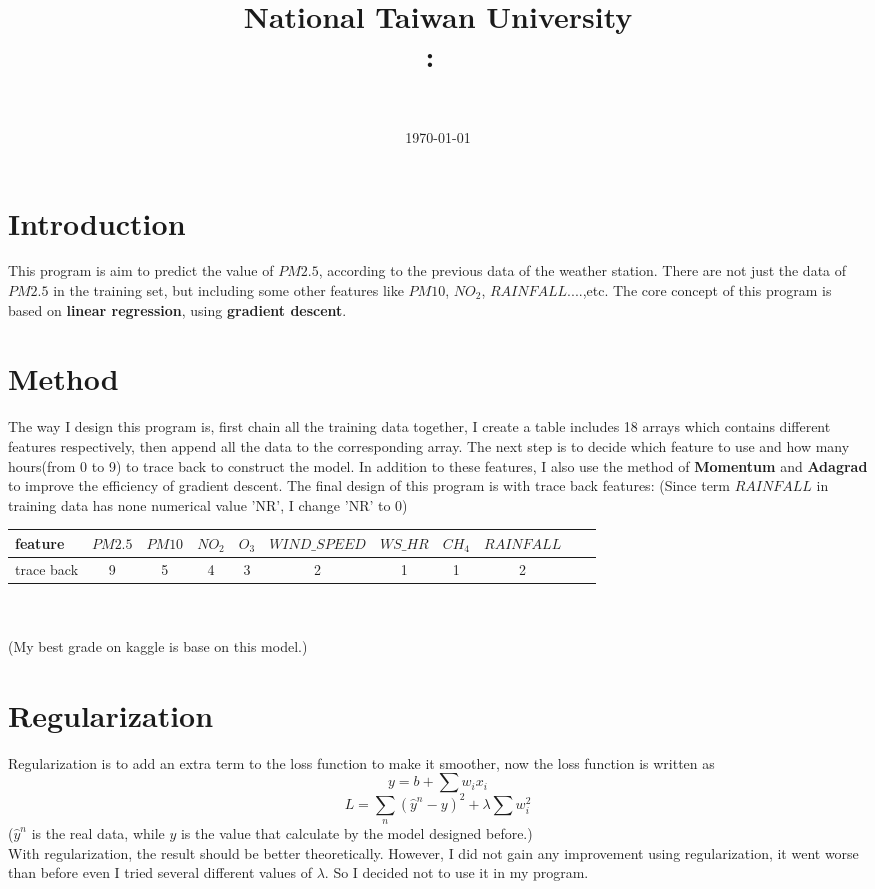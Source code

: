 \documentclass[11pt]{article}
\title{
{National Taiwan University}\\    
    \textmd{\textbf{\Class:\ \Title}}
}
\author{
	\Department \ \AuthorID \\
	\textbf{\AuthorName}
}
\date{
	\today \\
	\horline{1pt}
}
\newcommand\n{\mbox{\qquad}}
\begin{document}
\maketitle

\section{Introduction}
\n This program is aim to predict the value of $PM2.5$, according to the previous data of the weather station. There are not just the data of $PM2.5$ in the training set, but including some other features like $PM10$, $NO_2$, $RAINFALL$....,etc. The core concept of this program is based on \textbf{linear regression}, using \textbf{gradient descent}.

\section{Method}
\n The way I design this program is, first chain all the training data together, I create a table includes 18 arrays which contains different features respectively, then append all the data to the corresponding array. The next step is to decide which feature to use and how many hours(from 0 to 9) to trace back to construct the model. In addition to these features, I also use the method of \textbf{Momentum} and \textbf{Adagrad} to improve the efficiency of gradient descent. The final design of this program is with trace back features: (Since term $RAINFALL$ in training data has none numerical value 'NR', I change 'NR' to 0)\\
\begin{tabular}[t]{|l|c|c|c|c|c|c|c|c|c|c|}
	\hline
	feature & $PM2.5$ & $PM10$ & $NO_2$ & $O_3$ & $WIND\_SPEED$ & $WS\_HR$ & $CH_4$ & 	$RAINFALL$\\
	\hline 
	trace back & 9 & 5 & 4 & 3 & 2 & 1 & 1 & 2\\
	\hline
\end{tabular} 
\\ \\ 
\n (My best grade on kaggle is base on this model.)

\section{Regularization}
\n Regularization is to add an extra term to the loss function to make it smoother, now the loss function is written as
\[ y = b + \sum w_i x_i \]
\begin{equation}
	L = \sum_n (\widehat{y}^n - y)^2 + \lambda \sum w_i^2
\end{equation}
\n ($\widehat{y}^n$ is the real data, while $y$ is the value that calculate by the model designed before.)\\
	With regularization, the result should be better theoretically. However, I did not gain any improvement using regularization, it went worse than before even  I tried several different values of $\lambda$. So I decided not to use it in my program. 
\end{document}
